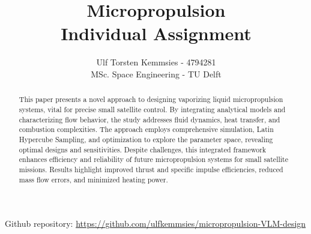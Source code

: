 \documentclass{homework}
\title{Micropropulsion \\ Individual Assignment}
\author{Ulf Torsten Kemmsies - 4794281  \\
MSc. Space Engineering - TU Delft}
\begin{document}
\maketitle

\begin{abstract}
    This paper presents a novel approach to designing vaporizing liquid micropropulsion systems, vital for precise small satellite control. By integrating analytical models and characterizing flow behavior, the study addresses fluid dynamics, heat transfer, and combustion complexities. The approach employs comprehensive simulation, Latin Hypercube Sampling, and optimization to explore the parameter space, revealing optimal designs and sensitivities. Despite challenges, this integrated framework enhances efficiency and reliability of future micropropulsion systems for small satellite missions. Results highlight improved thrust and specific impulse efficiencies, reduced mass flow errors, and minimized heating power.
\end{abstract}

\begin{center}
Github repository: \url{https://github.com/ulfkemmsies/micropropulsion-VLM-design}    
\end{center}
\end{document}
